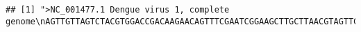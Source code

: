 \documentclass[
]{book}
\begin{document}
\begin{verbatim}
## [1] ">NC_001477.1 Dengue virus 1, complete genome\nAGTTGTTAGTCTACGTGGACCGACAAGAACAGTTTCGAATCGGAAGCTTGCTTAACGTAGTTCTAACAGT\nTTTTTATTAGAGAGCAGATCTCTGATGAACAACCAACGGAAAAAGACGGGTCGACCGTCTTTCAATATGC\nTGAAACGCGCGAGAAACCGCGTGTCAACTGTTTCACAGTTGGCGAAGAGATTCTCAAAAGGATTGCTTTC\nAGGCCAAGGACCCATGAAATTGGTGATGGCTTTTATAGCATTCCTAAGATTTCTAGCCATACCTCCAACA\nGCAGGAATTTTGGCTAGATGGGGCTCATTCAAGAAGAATGGAGCGATCAAAGTGTTACGGGGTTTCAAGA\nAAGAAATCTCAAACATGTTGAACATAATGAACAGGAGGAAAAGATCTGTGACCATGCTCCTCATGCTGCT\nGCCCACAGCCCTGGCGTTCCATCTGACCACCCGAGGGGGAGAGCCGCACATGATAGTTAGCAAGCAGGAA\nAGAGGAAAATCACTTTTGTTTAAGACCTCTGCAGGTGTCAACATGTGCACCCTTATTGCAATGGATTTGG\nGAGAGTTATGTGAGGACACAATGACCTACAAATGCCCCCGGATCACTGAGACGGAACCAGATGACGTTGA\nCTGTTGGTGCAATGCCACGGAGACATGGGTGACCTATGGAACATGTTCTCAAACTGGTGAACACCGACGA\nGACAAACGTTCCGTCGCACTGGCACCACACGTAGGGCTTGGTCTAGAAACAAGAACCGAAACGTGGATGT\nCCTCTGAAGGCGCTTGGAAACAAATACAAAAAGTGGAGACCTGGGCTCTGAGACACCCAGGATTCACGGT\nGATAGCCCTTTTTCTAGCACATGCCATAGGAACATCCATCACCCAGAAAGGGATCATTTTTATTTTGCTG\nATGCTGGTAACTCCATCCATGGCCATGCGGTGCGTGGGAATAGGCAACAGAGACTTCGTGGAAGGACTGT\nCAGGAGCTACGTGGGTGGATGTGGTACTGGAGCATGGAAGTTGCGTCACTACCATGGCAAAAGACAAACC\nAACACTGGACATTGAACTCTTGAAGACGGAGGTCACAAACCCTGCCGTCCTGCGCAAACTGTGCATTGAA\nGCTAAAATATCAAACACCACCACCGATTCGAGATGTCCAACACAAGGAGAAGCCACGCTGGTGGAAGAAC\nAGGACACGAACTTTGTGTGTCGACGAACGTTCGTGGACAGAGGCTGGGGCAATGGTTGTGGGCTATTCGG\nAAAAGGTAGCTTAATAACGTGTGCTAAGTTTAAGTGTGTGACAAAACTGGAAGGAAAGATAGTCCAATAT\nGAAAACTTAAAATATTCAGTGATAGTCACCGTACACACTGGAGACCAGCACCAAGTTGGAAATGAGACCA\nCAGAACATGGAACAACTGCAACCATAACACCTCAAGCTCCCACGTCGGAAATACAGCTGACAGACTACGG\nAGCTCTAACATTGGATTGTTCACCTAGAACAGGGCTAGACTTTAATGAGATGGTGTTGTTGACAATGAAA\nAAAAAATCATGGCTCGTCCACAAACAATGGTTTCTAGACTTACCACTGCCTTGGACCTCGGGGGCTTCAA\nCATCCCAAGAGACTTGGAATAGACAAGACTTGCTGGTCACATTTAAGACAGCTCATGCAAAAAAGCAGGA\nAGTAGTCGTACTAGGATCACAAGAAGGAGCAATGCACACTGCGTTGACTGGAGCGACAGAAATCCAAACG\nTCTGGAACGACAACAATTTTTGCAGGACACCTGAAATGCAGATTAAAAATGGATAAACTGATTTTAAAAG\nGGATGTCATATGTAATGTGCACAGGGTCATTCAAGTTAGAGAAGGAAGTGGCTGAGACCCAGCATGGAAC\nTGTTCTAGTGCAGGTTAAATACGAAGGAACAGATGCACCATGCAAGATCCCCTTCTCGTCCCAAGATGAG\nAAGGGAGTAACCCAGAATGGGAGATTGATAACAGCCAACCCCATAGTCACTGACAAAGAAAAACCAGTCA\nACATTGAAGCGGAGCCACCTTTTGGTGAGAGCTACATTGTGGTAGGAGCAGGTGAAAAAGCTTTGAAACT\nAAGCTGGTTCAAGAAGGGAAGCAGTATAGGGAAAATGTTTGAAGCAACTGCCCGTGGAGCACGAAGGATG\nGCCATCCTGGGAGACACTGCATGGGACTTCGGTTCTATAGGAGGGGTGTTCACGTCTGTGGGAAAACTGA\nTACACCAGATTTTTGGGACTGCGTATGGAGTTTTGTTCAGCGGTGTTTCTTGGACCATGAAGATAGGAAT\nAGGGATTCTGCTGACATGGCTAGGATTAAACTCAAGGAGCACGTCCCTTTCAATGACGTGTATCGCAGTT\nGGCATGGTCACACTGTACCTAGGAGTCATGGTTCAGGCGGACTCGGGATGTGTAATCAACTGGAAAGGCA\nGAGAACTCAAATGTGGAAGCGGCATTTTTGTCACCAATGAAGTCCACACCTGGACAGAGCAATATAAATT\nCCAGGCCGACTCCCCTAAGAGACTATCAGCGGCCATTGGGAAGGCATGGGAGGAGGGTGTGTGTGGAATT\nCGATCAGCCACTCGTCTCGAGAACATCATGTGGAAGCAAATATCAAATGAATTAAACCACATCTTACTTG\nAAAATGACATGAAATTTACAGTGGTCGTAGGAGACGTTAGTGGAATCTTGGCCCAAGGAAAGAAAATGAT\nTAGGCCACAACCCATGGAACACAAATACTCGTGGAAAAGCTGGGGAAAAGCCAAAATCATAGGAGCAGAT\nGTACAGAATACCACCTTCATCATCGACGGCCCAAACACCCCAGAATGCCCTGATAACCAAAGAGCATGGA\nACATTTGGGAAGTTGAAGACTATGGATTTGGAATTTTCACGACAAACATATGGTTGAAATTGCGTGACTC\nCTACACTCAAGTGTGTGACCACCGGCTAATGTCAGCTGCCATCAAGGATAGCAAAGCAGTCCATGCTGAC\nATGGGGTACTGGATAGAAAGTGAAAAGAACGAGACTTGGAAGTTGGCAAGAGCCTCCTTCATAGAAGTTA\nAGACATGCATCTGGCCAAAATCCCACACTCTAT
\end{verbatim}
\end{document}
